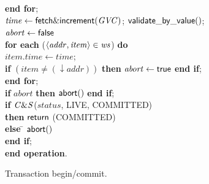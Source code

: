 \begin{figure} [htb]
{{\begin{minipage}[t]{1\linewidth}
\begin{tabbing}
 \> {\bf end for}; \\

 \> $\mathit{time} \gets {\sf fetch\&increment}(\mathit{GVC})$; ${\sf validate\_by\_value}()$; \\



 \> $\mathit{abort} \gets \lit{false}$ \\
 \> 
{\bf for each} ($\left \langle \mathit{addr, item} \right \rangle  \in \mathit{ws}$) {\bf do} \\
 \>\> $\mathit{item.time} \gets \mathit{time}$; \\
 \>\> {\bf if} $(\mathit{item} \neq (\downarrow \mathit{addr}))$  
                 {\bf then}  
		    $\mathit{abort} \gets \lit{true}$
                {\bf end if}; \\

 \> {\bf end for}; \\
 \> {\bf if} $\mathit{abort}$ {\bf then} ${\sf abort}()$ {\bf end if}; \\
 \> {\bf if} ${\sf \mathit{C\&S}}$($\mathit{status}$, LIVE, COMMITTED) \\
 \>\> {\bf then} \> ${\sf return}$ (COMMITTED)\\
 \> \> {\bf else} \= ${\sf abort}()$ \\
 \> {\bf end if};  \\
{\bf end operation}.

\end{tabbing}
\normalsize
\end{minipage}
}
\caption{Transaction begin/commit.}
\label{fig:tbc}
}
\end{figure}

